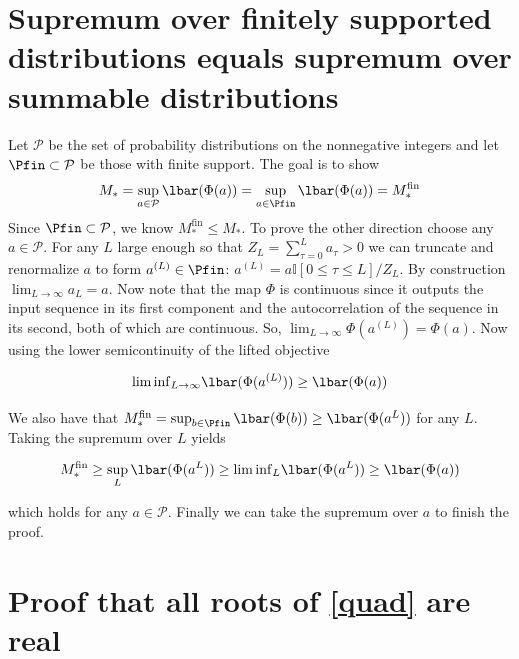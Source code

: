 \documentclass{article}
\begin{document}
\printbibliography

\appendix 

\section{Supremum over finitely supported distributions equals supremum over summable distributions}\label{sec:mfinmstar}

Let $\mathcal{P}$ be the set of probability distributions on the nonnegative integers and let $\Pfin \subset \mathcal{P}$ be those with finite support. The goal is to show 
\begin{equation}
    M_\ast = \sup_{a \in \mathcal{P}} \lbar(\Phi(a)) = \sup_{a \in \Pfin} \lbar(\Phi(a)) = M_\ast^{\textrm{fin}}
\end{equation}
Since $\Pfin \subset \mathcal{P}$, we know $M_\ast^{\textrm{fin}} \le M_\ast$. To prove the other direction
choose any $a \in \mathcal{P}$. For any $L$ large enough so that $Z_L = \sum_{\tau=0}^L a_\tau > 0$ we can truncate and renormalize $a$ to form $a^{(L)} \in \Pfin$: $a^{(L)} = a \mathbb{I}[0 \le \tau \le L]/Z_L$. By construction $\lim_{L\to \infty} a_L = a$. Now note that the map $\Phi$ is continuous since it outputs the input sequence in its first component and the autocorrelation of the sequence in its second, both of which are continuous. So, $\lim_{L \to \infty}\Phi(a^{(L)}) = \Phi(a)$. Now using the lower semicontinuity of the lifted objective

\begin{equation}
    {\lim\inf}_{L \to \infty} \lbar(\Phi(a^{(L)})) \ge \lbar(\Phi(a))
\end{equation}

We also have that $M_\ast^{\textrm{fin}} = \sup_{b \in \Pfin} \lbar(\Phi(b)) \ge \lbar(\Phi(a^{L}))$ for any $L$. Taking the supremum over $L$ yields 

\begin{equation}
    M_\ast^{\textrm{fin}} \ge \sup_L \lbar(\Phi(a^{L})) \ge {\liminf}_{L}\lbar(\Phi(a^{L})) \ge \lbar(\Phi(a))
\end{equation}

which holds for any $a \in \mathcal{P}$. Finally we can take the supremum over $a$ to finish the proof. 

\section{Proof that all roots of \eqref{quad} are real}\label{sec:real}
\end{document}
